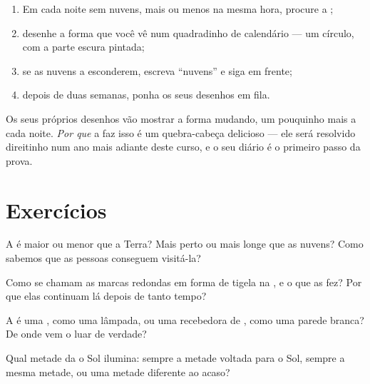 \begin{method}\label{met:g2:moon-in-the-sky:diary}
\begin{enumerate}
  \item Em cada noite sem nuvens, mais ou menos na mesma hora,
        procure a ;
  \item desenhe a forma que você vê num quadradinho de calendário ---
        um círculo, com a parte escura pintada;
  \item se as nuvens a esconderem, escreva ``nuvens'' e siga em
        frente;
  \item depois de duas semanas, ponha os seus desenhos em fila.
\end{enumerate}
Os seus próprios desenhos vão mostrar a forma mudando, um pouquinho
mais a cada noite. \emph{Por que} a  faz isso é um quebra-cabeça
delicioso --- ele será resolvido direitinho num ano mais adiante
deste curso, e o seu diário é o primeiro passo da prova.
\end{method}

\section{Exercícios}

\begin{exercise}[$\star$]\label{exo:g2:moon-in-the-sky:1}
A  é maior ou menor que a Terra? Mais perto ou mais longe que as
nuvens? Como sabemos que as pessoas conseguem visitá-la?
\end{exercise}

\begin{exercise}[$\star$]\label{exo:g2:moon-in-the-sky:2}
Como se chamam as marcas redondas em forma de tigela na , e o que
as fez? Por que elas continuam lá depois de tanto tempo?
\end{exercise}

\begin{exercise}[$\star$]\label{exo:g2:moon-in-the-sky:3}
A  é uma , como uma lâmpada, ou uma recebedora de ,
como uma parede branca? De onde vem o luar de verdade?
\end{exercise}

\begin{exercise}[$\star$]\label{exo:g2:moon-in-the-sky:4}
Qual metade da  o Sol ilumina: sempre a metade voltada para o Sol,
sempre a mesma metade, ou uma metade diferente ao acaso?
\end{exercise}


